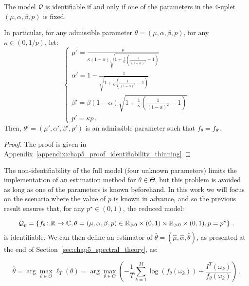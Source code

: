     \begin{proposition}\label{prop:chap5_identifiability_thinning}
        The model $\mathcal{Q}$ is identifiable if and only if one of the parameters in the 4-uplet $(\mu, \alpha, \beta, p)$ is fixed.

        In particular, for any admissible parameter $\theta = (\mu, \alpha, \beta, p)$,
        for any $\kappa\in(0, 1/p)$, let:
        \begin{equation}\label{eq:chap5_nonidentifiable_parameters}
        \begin{cases}
            \mu' = \frac{\mu}{\kappa(1-\alpha)\sqrt{1 + \frac{1}{\kappa}\left(\frac{1}{(1-\alpha)^2} - 1\right)}}\\
            \alpha' = 1 - \frac{1}{\sqrt{1 + \frac{1}{\kappa}\left(\frac{1}{(1-\alpha)^2} - 1\right)}}\\
            \beta' = \beta (1-\alpha) \sqrt{1 + \frac{1}{\kappa}\left(\frac{1}{(1-\alpha)^2} - 1\right)}\\
            p' = \kappa p\,.
          \end{cases}
        \end{equation}
          Then, $\theta' = (\mu', \alpha', \beta', p')$ is an admissible parameter such that $f_{\theta} = f_{\theta'}$.
    \end{proposition}

    \begin{proof}
        The proof is given in Appendix~\ref{appendix:chap5_proof_identifiability_thinning}
    \end{proof}

    The non-identifiability of the full model (four unknown parameters) limits the implementation of an estimation method for $\theta\in\Theta$, but this problem is avoided as long as one of the parameters is known beforehand. 
    In this work we will focus on the scenario where the value of $p$ is known in advance, 
    and so the previous result ensures that, for any $p^\star\in(0,1)$, the reduced model:
    
    \[\mathcal{Q}_{p} = 
        \left\{
            f_\theta \colon {\mathbb R} \to {\mathbb C}, 
            \theta = (\mu, \alpha, \beta, p) \in {\mathbb R}_{>0}\times (0,1) \times {\mathbb R}_{>0}\times(0,1), p=p^\star
        \right\}\,,
    \]
    is identifiable.
    We can then define an estimator of $\hat \theta = (\hat \mu, \hat \alpha, \hat \theta)$, as presented at the end of Section~\ref{sec:chap5_spectral_theory}, as:

    \[
        \hat \theta = \arg\max_{\theta \in \Theta} \ell_T (\theta)
        = \arg\max_{\theta \in \Theta}  \left(-\frac{1}{T}\sum_{k=1}^{M}{\log(f_\theta (\omega_k)) + \frac{I^T(\omega_k)}{f_\theta(\omega_k)}}\right)\,.
    \]

